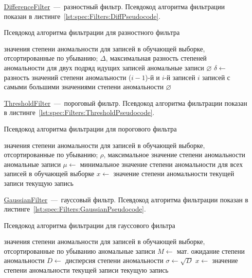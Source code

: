 \uline{DifferenceFilter}~---~разностный фильтр. Псевдокод алгоритма фильтрации показан в листинге~\ref{lst:spec:Filters:DiffPseudocode}.

\begin{algorithm}[hb!]
\caption{Псевдокод алгоритма фильтрации для разностного фильтра}
\label{lst:spec:Filters:DiffPseudocode}
\begin{algorithmic}[1]
\REQUIRE значения степени аномальности для записей в обучающей выборке, отсортированные по убыванию; $\Delta$, максимальная разность степеней аномальности для двух подряд идущих записей
\ENSURE аномальные записи
	\RETURN $\varnothing$
\ENDIF
{}
	\STATE $\delta \leftarrow$ разность значений степени аномальности ($i-1$)-й и $i$-й записей
	\IF{$\delta > \Delta$}
		\RETURN $i$ записей с самыми большими значениями степени аномальности
	\ENDIF
\ENDFOR
\RETURN $\varnothing$
\end{algorithmic}
\end{algorithm}

\uline{ThresholdFilter}~---~пороговый фильтр. Псевдокод алгоритма фильтрации показан в листинге~\ref{lst:spec:Filters:ThresholdPseudocode}.

\begin{algorithm}[hb!]
\caption{Псевдокод алгоритма фильтрации для порогового фильтра}
\label{lst:spec:Filters:ThresholdPseudocode}
\begin{algorithmic}[1]
\REQUIRE значения степени аномальности для записей в обучающей выборке, отсортированные по убыванию; $\rho$, максимальное значение степени аномальности
\ENSURE аномальные записи
\STATE $\mu \leftarrow$ минимальное значение степени аномальности для всех записей в обучающей выборке
	\STATE $x \leftarrow$ значение степени аномальности текущей записи
		\RETURN текущую запись
	\ENDIF
\ENDFOR
\end{algorithmic}
\end{algorithm}

\uline{GaussianFilter}~---~гауссовый фильтр. Псевдокод алгоритма фильтрации показан в листинге~\ref{lst:spec:Filters:GaussianPseudocode}.

\begin{algorithm}[h!]
\caption{Псевдокод алгоритма фильтрации для гауссового фильтра}
\label{lst:spec:Filters:GaussianPseudocode}
\begin{algorithmic}[1]
\REQUIRE значения степени аномальности для записей в обучающей выборке, отсортированные по убыванию
\ENSURE аномальные записи
\STATE $M \leftarrow$ мат. ожидание степени аномальности
\STATE $D \leftarrow$ дисперсия степени аномальности
\STATE $\sigma \leftarrow \sqrt{D}$
	\STATE $x \leftarrow$ значение степени аномальности текущей записи
		\RETURN текущую запись
	\ENDIF
\ENDFOR
\end{algorithmic}
\end{algorithm}

